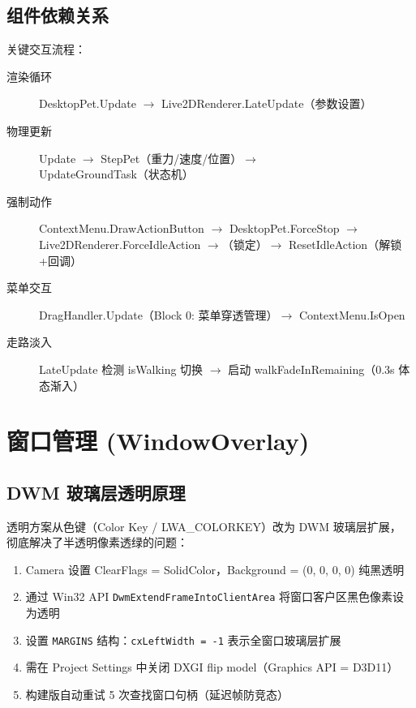 \documentclass[12pt,a4paper]{ctexart}
\begin{document}
\subsection{组件依赖关系}

关键交互流程：

\begin{description}
    \item[渲染循环] DesktopPet.Update $\to$ Live2DRenderer.LateUpdate（参数设置）
    \item[物理更新] Update $\to$ StepPet（重力/速度/位置）$\to$ UpdateGroundTask（状态机）
    \item[强制动作] ContextMenu.DrawActionButton $\to$ DesktopPet.ForceStop $\to$ \\[2pt]
        \hspace*{2em}Live2DRenderer.ForceIdleAction $\to$（锁定）$\to$ ResetIdleAction（解锁+回调）
    \item[菜单交互] DragHandler.Update（Block 0: 菜单穿透管理）$\to$ ContextMenu.IsOpen
    \item[走路淡入] LateUpdate 检测 isWalking 切换 $\to$ 启动 walkFadeInRemaining（0.3s 体态渐入）
\end{description}

\section{窗口管理 (WindowOverlay)}

\subsection{DWM 玻璃层透明原理}

透明方案从色键（Color Key / LWA\_COLORKEY）改为 DWM 玻璃层扩展，
彻底解决了半透明像素透绿的问题：

\begin{enumerate}
    \item Camera 设置 ClearFlags = SolidColor，Background = (0, 0, 0, 0) 纯黑透明
    \item 通过 Win32 API \texttt{DwmExtendFrameIntoClientArea} 将窗口客户区黑色像素设为透明
    \item 设置 \texttt{MARGINS} 结构：\texttt{cxLeftWidth = -1} 表示全窗口玻璃层扩展
    \item 需在 Project Settings 中关闭 DXGI flip model（Graphics API = D3D11）
    \item 构建版自动重试 5 次查找窗口句柄（延迟帧防竞态）
\end{enumerate}
\end{document}
